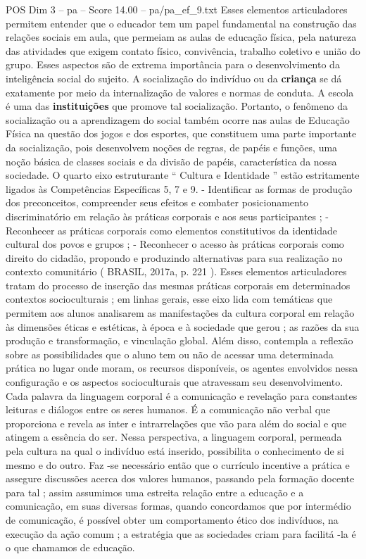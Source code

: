 \begin{textsample}{POS Dim 3 – pa – Score 14.00 – pa/pa\_ef\_9.txt}
Esses elementos articuladores permitem entender que o educador tem um papel fundamental na construção das relações sociais em aula, que permeiam as aulas de educação física, pela natureza das atividades que exigem contato físico, convivência, trabalho coletivo e união do grupo.
Esses aspectos são de extrema importância para o desenvolvimento da inteligência social do sujeito.
A socialização do indivíduo ou da \textbf{criança} se dá exatamente por meio da internalização de valores e normas de conduta.
A escola é uma das \textbf{instituições} que promove tal socialização.
Portanto, o fenômeno da socialização ou a aprendizagem do social também ocorre nas aulas de Educação Física na questão dos jogos e dos esportes, que constituem uma parte importante da socialização, pois desenvolvem noções de regras, de papéis e funções, uma noção básica de classes sociais e da divisão de papéis, característica da nossa sociedade.
O quarto eixo estruturante “ Cultura e Identidade ” estão estritamente ligados às Competências Específicas 5, 7 e 9. - Identificar as formas de produção dos preconceitos, compreender seus efeitos e combater posicionamento discriminatório em relação às práticas corporais e aos seus participantes ; - Reconhecer as práticas corporais como elementos constitutivos da identidade cultural dos povos e grupos ; - Reconhecer o acesso às práticas corporais como direito do cidadão, propondo e produzindo alternativas para sua realização no contexto comunitário ( BRASIL, 2017a, p. 221 ).
Esses elementos articuladores tratam do processo de inserção das mesmas práticas corporais em determinados contextos socioculturais ; em linhas gerais, esse eixo lida com temáticas que permitem aos alunos analisarem as manifestações da cultura corporal em relação às dimensões éticas e estéticas, à época e à sociedade que gerou ; as razões da sua produção e transformação, e vinculação global.
Além disso, contempla a reflexão sobre as possibilidades que o aluno tem ou não de acessar uma determinada prática no lugar onde moram, os recursos disponíveis, os agentes envolvidos nessa configuração e os aspectos socioculturais que atravessam seu desenvolvimento.
Cada palavra da linguagem corporal é a comunicação e revelação para constantes leituras e diálogos entre os seres humanos.
É a comunicação não verbal que proporciona e revela as inter e intrarrelações que vão para além do social e que atingem a essência do ser.
Nessa perspectiva, a linguagem corporal, permeada pela cultura na qual o indivíduo está inserido, possibilita o conhecimento de si mesmo e do outro.
Faz -se necessário então que o currículo incentive a prática e assegure discussões acerca dos valores humanos, passando pela formação docente para tal ; assim assumimos uma estreita relação entre a educação e a comunicação, em suas diversas formas, quando concordamos que por intermédio de comunicação, é possível obter um comportamento ético dos indivíduos, na execução da ação comum ; a estratégia que as sociedades criam para facilitá -la é o que chamamos de educação.

\end{textsample}
